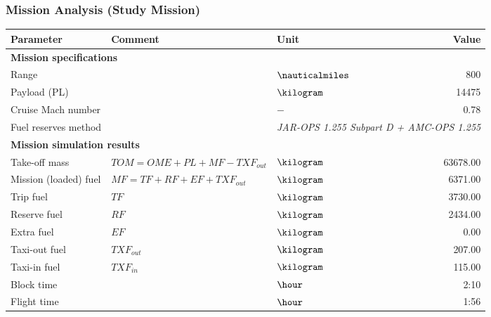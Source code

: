 
\begin{frame}
 \frametitle{Mission Analysis (Study Mission)}

 \begin{table}
     \centering
     \scriptsize
     \begin{tabularx}{250pt}{Xllr}
         \toprule
         \textcolor{ilrdark}{Parameter} & \textcolor{ilrdark}{Comment} & \textcolor{ilrdark}{Unit} & \textcolor{ilrdark}{Value} \\
         \midrule[0.5pt]
         \multicolumn{4}{l}{\textbf{Mission specifications}}\\
         \midrule[0.5pt]
             Range                 & & $\nauticalmiles$        & 800 \\ 
             Payload (PL)          & & $\kilogram$                & 14475 \\ 
             Cruise Mach number &             & $-$                & 0.78 \\ 
             Fuel reserves method &      &  \multicolumn{2}{c}{\textit{JAR-OPS 1.255 Subpart D + AMC-OPS 1.255}} \\
         \midrule[0.5pt]
         \multicolumn{4}{l}{\textbf{Mission simulation results}}\\
         \midrule[0.5pt]
             Take-off mass & \tiny{$TOM = OME + PL + MF - TXF_{out}$} & $\kilogram$ & 63678.00 \\ 
             Mission (loaded) fuel  &\tiny{$MF = TF + RF + EF + TXF_{out}$}  & $\kilogram$   & 6371.00 \\ 
             Trip fuel      & \tiny{$TF$}        & $\kilogram$   & 3730.00 \\ 
             Reserve fuel   & \tiny{$RF$}        & $\kilogram$   & 2434.00 \\ 
             Extra fuel     & \tiny{$EF$}        & $\kilogram$   & 0.00 \\ 
             Taxi-out fuel  & \tiny{$TXF_{out}$} & $\kilogram$   & 207.00 \\ 
             Taxi-in fuel   & \tiny{$TXF_{in}$}  & $\kilogram$   & 115.00 \\ 
             Block time             && $\hour$              & 2:10 \\ 
             Flight time              && $\hour$                  & 1:56 \\ 
        \bottomrule
    \end{tabularx}
 \end{table}

\end{frame}
